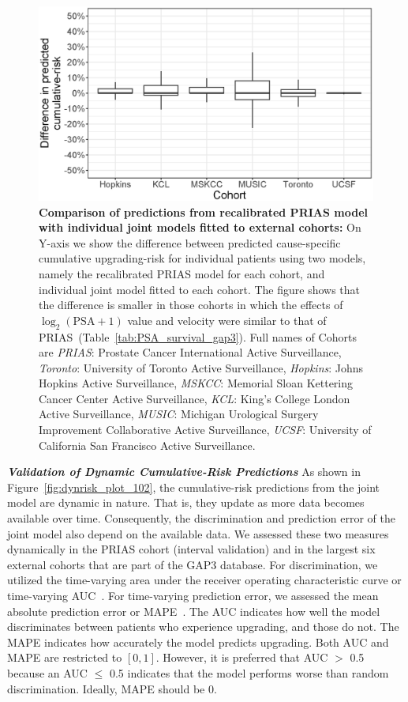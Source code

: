 \begin{figure}[!htb]
\centerline{\includegraphics[width=0.85\columnwidth]{images/calib_insmall_after.eps}}
\caption{\textbf{Comparison of predictions from recalibrated PRIAS model with individual joint models fitted to external cohorts:} On Y-axis we show the difference between predicted cause-specific cumulative upgrading-risk for individual patients using two models, namely the recalibrated PRIAS model for each cohort, and individual joint model fitted to each cohort. The figure shows that the difference is smaller in those cohorts in which the effects of $\log_2 (\mbox{PSA} + 1)$ value and velocity were similar to that of PRIAS~(Table~\ref{tab:PSA_survival_gap3}). Full names of Cohorts are \textit{PRIAS}: Prostate Cancer International Active Surveillance, \textit{Toronto}: University of Toronto Active Surveillance, \textit{Hopkins}: Johns Hopkins Active Surveillance, \textit{MSKCC}: Memorial Sloan Kettering Cancer Center Active Surveillance, \textit{KCL}: King's College London Active Surveillance, \textit{MUSIC}: Michigan Urological Surgery Improvement Collaborative Active Surveillance, \textit{UCSF}: University of California San Francisco Active Surveillance.}
\label{fig:calib_insmall_after}
\end{figure}

\clearpage
\textbf{\textit{Validation of Dynamic Cumulative-Risk Predictions}}
As shown in Figure~\ref{fig:dynrisk_plot_102}, the cumulative-risk predictions from the joint model are dynamic in nature. That is, they update as more data becomes available over time. Consequently, the discrimination and prediction error of the joint model also depend on the available data. We assessed these two measures dynamically in the PRIAS cohort (interval validation) and in the largest six external cohorts that are part of the GAP3 database. For discrimination, we utilized the time-varying area under the receiver operating characteristic curve or time-varying AUC~\citep{rizopoulos2017dynamic}. For time-varying prediction error, we assessed the mean absolute prediction error or MAPE~\citep{rizopoulos2017dynamic}. The AUC indicates how well the model discriminates between patients who experience upgrading, and those do not. The MAPE indicates how accurately the model predicts upgrading. Both AUC and MAPE are restricted to $[0,1]$. However, it is preferred that AUC $>$ 0.5 because an AUC $\leq$ 0.5 indicates that the model performs worse than random discrimination. Ideally, MAPE should be 0.

